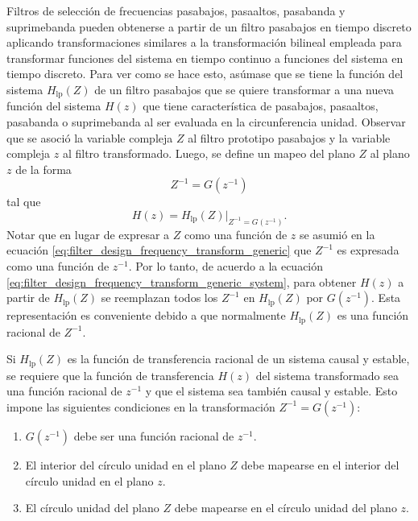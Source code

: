 \documentclass[a4paper]{report}
\begin{document}
Filtros de selección de frecuencias pasabajos, pasaaltos, pasabanda y suprimebanda pueden obtenerse a partir de un filtro pasabajos en tiempo discreto aplicando transformaciones similares a la transformación bilineal empleada para transformar funciones del sistema en tiempo continuo a funciones del sistema en tiempo discreto. Para ver como se hace esto, asúmase que se tiene la función del sistema \(H_\textrm{lp}(Z)\) de un filtro pasabajos que se quiere transformar a una nueva función del sistema \(H(z)\) que tiene característica de pasabajos, pasaaltos, pasabanda o suprimebanda al ser evaluada en la circunferencia unidad. Observar que se asoció la variable compleja \(Z\) al filtro prototipo pasabajos y la variable compleja \(z\) al filtro transformado. Luego, se define un mapeo del plano \(Z\) al plano \(z\) de la forma 
\begin{equation}\label{eq:filter_design_frequency_transform_generic}
 Z^{-1}=G(z^{-1}) 
\end{equation}
tal que 
\begin{equation}\label{eq:filter_design_frequency_transform_generic_system}
 H(z)=H_\textrm{lp}(Z)\Big|_{Z^{-1}=G(z^{-1})}. 
\end{equation}
Notar que en lugar de expresar a \(Z\) como una función de \(z\) se asumió en la ecuación \ref{eq:filter_design_frequency_transform_generic} que \(Z^{-1}\) es expresada como una función de \(z^{-1}\). Por lo tanto, de acuerdo a la ecuación \ref{eq:filter_design_frequency_transform_generic_system}, para obtener \(H(z)\) a partir de \(H_\textrm{lp}(Z)\) se reemplazan todos los \(Z^{-1}\) en \(H_\textrm{lp}(Z)\) por \(G(z^{-1})\). Esta representación es conveniente debido a que normalmente \(H_\textrm{lp}(Z)\) es una función racional de \(Z^{-1}\). 

Si \(H_\textrm{lp}(Z)\) es la función de transferencia racional de un sistema causal y estable, se requiere que la función de transferencia \(H(z)\) del sistema transformado sea una función racional de \(z^{-1}\) y que el sistema sea también causal y estable. Esto impone las siguientes condiciones en la transformación \(Z^{-1}=G(z^{-1})\):
\begin{enumerate}
 \item \(G(z^{-1})\) debe ser una función racional de \(z^{-1}\).
 \item El interior del círculo unidad en el plano \(Z\) debe mapearse en el interior del círculo unidad en el plano \(z\).
 \item El círculo unidad del plano \(Z\) debe mapearse en el círculo unidad del plano \(z\).
\end{enumerate}
\end{document}
